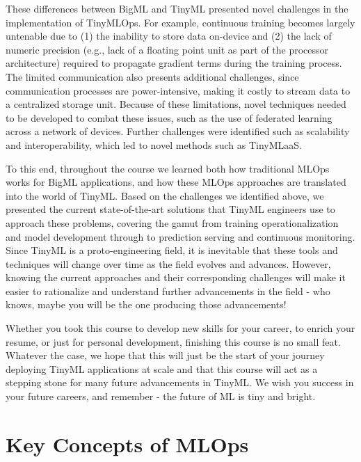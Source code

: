 {{{{{{{{    These differences between BigML and TinyML presented novel challenges in the implementation of TinyMLOps. For example, continuous training becomes largely untenable due to (1) the inability to store data on-device and (2) the lack of numeric precision (e.g., lack of a floating point unit as part of the processor architecture) required to propagate gradient terms during the training process. The limited communication also presents additional challenges, since communication processes are power-intensive, making it costly to stream data to a centralized storage unit. Because of these limitations, novel techniques needed to be developed to combat these issues, such as the use of federated learning across a network of devices. Further challenges were identified such as scalability and interoperability, which led to novel methods such as TinyMLaaS.
    
    To this end, throughout the course we learned both how traditional MLOps works for BigML applications, and how these MLOps approaches are translated into the world of TinyML. Based on the challenges we identified above, we presented the current state-of-the-art solutions that TinyML engineers use to approach these problems, covering the gamut from training operationalization and model development through to prediction serving and continuous monitoring. Since TinyML is a proto-engineering field, it is inevitable that these tools and techniques will change over time as the field evolves and advances. However, knowing the current approaches and their corresponding challenges will make it easier to rationalize and understand further advancements in the field - who knows, maybe you will be the one producing those advancements!
    
    Whether you took this course to develop new skills for your career, to enrich your resume, or just for personal development, finishing this course is no small feat. Whatever the case, we hope that this will just be the start of your journey deploying TinyML applications at scale and that this course will act as a stepping stone for many future advancements in TinyML. We wish you success in your future careers, and remember - the future of ML is tiny and bright.  
    
\section{Key Concepts of MLOps}

}}}}}}}}
